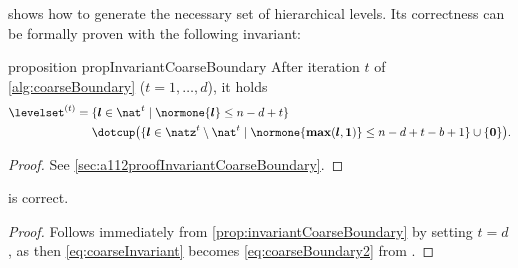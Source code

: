  shows how to generate the necessary set of
hierarchical levels.
Its correctness can be formally proven with the following invariant:
\begin{restatable}{%
  proposition%
}{%
  propInvariantCoarseBoundary%
}
  \label{prop:invariantCoarseBoundary}
  After iteration $t$ of \cref{alg:coarseBoundary}
  ($t = 1, \dotsc, d$), it holds
  \begin{equation}
    \label{eq:coarseInvariant}
    \begin{split}
      \levelset^{(t)}
      &= \{\*l \in \nat^t \mid \normone{\*l} \le n - d + t\}\\
      &\hphantom{{}={}} {} \dotcup \paren*{
        \{\*l \in \natz^t \setminus \nat^t \mid
        \normone{\vecmax(\*l, \*1)} \le n-d+t-b+1\} \cup \{\*0\}
      }.
    \end{split}
  \end{equation}
\end{restatable}
\begin{proof}
  See \cref{sec:a112proofInvariantCoarseBoundary}.
\end{proof}
\begin{shortcorollary}
  \label{cor:algCoarseBoundaryCorrectness}
   is correct.
\end{shortcorollary}
\begin{proof}
  Follows immediately from \cref{prop:invariantCoarseBoundary}
  by setting $t = d$,
  as then \eqref{eq:coarseInvariant} becomes
  \eqref{eq:coarseBoundary2} from .
\end{proof}


